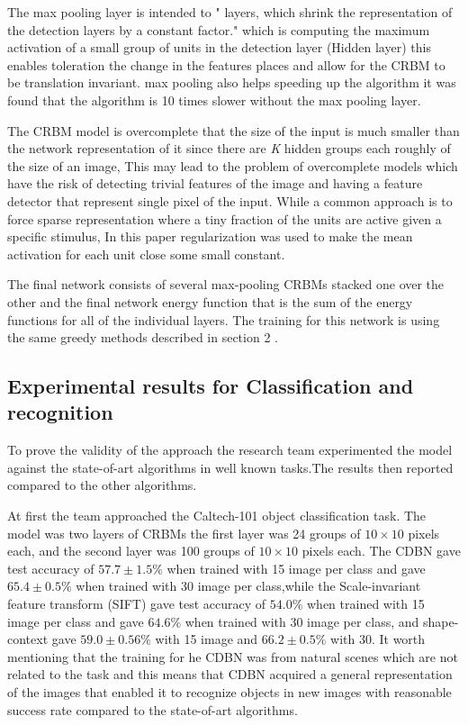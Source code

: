 \documentclass[12pt,twoside]{article}
\theoremstyle{plain}
\theoremstyle{definition}
\theoremstyle{remark}
\begin{document}
The max pooling layer is intended to " layers, which shrink the representation of the detection layers by a constant factor." \cite{Lee2009} which is computing the maximum activation of a small group of units in the detection layer (Hidden layer) this enables toleration the change in the features places and allow for the CRBM to be translation invariant. max pooling also helps speeding up the algorithm it was found  that the algorithm is 10 times slower without the 
max pooling layer.

The CRBM model is overcomplete that the size of the input is much smaller than the network representation of it since there are \textit{K} hidden groups each roughly of the size of an image, This may lead to the problem of overcomplete models which have the risk of detecting trivial features of the image and having a feature detector that represent single pixel of the input. While a common approach is to force sparse representation where a tiny fraction of the units are active given a specific stimulus, In this paper regularization was used to make the mean activation for each unit close some small constant.

The final network consists of several max-pooling CRBMs stacked one over the other and the final network energy function that is the sum of the energy functions for all of the individual layers. The training for this network is using the same greedy methods described in section 2 \cite{HintonSalakhutdinov2006b}.

\subsection{Experimental results for Classification and recognition}
To prove the validity of the approach the research team experimented the model against the state-of-art algorithms in well known tasks.The results then reported compared to the other algorithms.

At first the team approached  the Caltech-101 object classification task. The model was two layers of CRBMs the first layer was 24 groups of $10 \times 10$ pixels each, and the second layer was 100 groups of $10 \times 10$ pixels each. The CDBN gave test accuracy of $57.7 \pm 1.5\%$ when trained with 15 image per class and gave $65.4 \pm 0.5\%$ when trained with 30 image per class,while the Scale-invariant feature transform (SIFT) gave test accuracy of $54.0 \%$ when trained with 15 image per class and gave $64.6 \%$ when trained with 30 image per class, and shape-context gave  $59.0 \pm 0.56\%$ with 15 image and $66.2 \pm 0.5\%$ with 30.
It worth mentioning that the training for he CDBN was from natural scenes which are not related to the task and this means that CDBN acquired a general representation of the images that enabled it to recognize objects in new images with reasonable success rate compared to the state-of-art algorithms.
\end{document}
